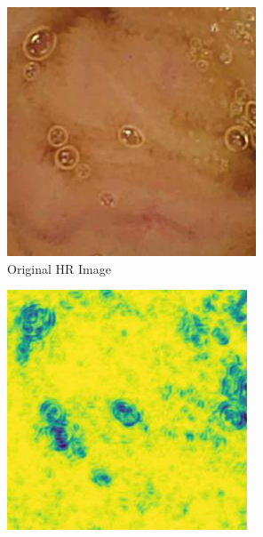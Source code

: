 \begin{figure}[H]
    \centering

    \begin{subfigure}[b]{0.275\textwidth}
    \includegraphics[width=\textwidth]{Chapter7/hr_9.jpg}
    \caption{Original HR Image}
  \end{subfigure}
  \begin{subfigure}[b]{0.275\textwidth}
    \includegraphics[width=\textwidth]{Chapter7/SSIM_bicubic_9.jpg}

\end{subfigure}
\end{figure}
